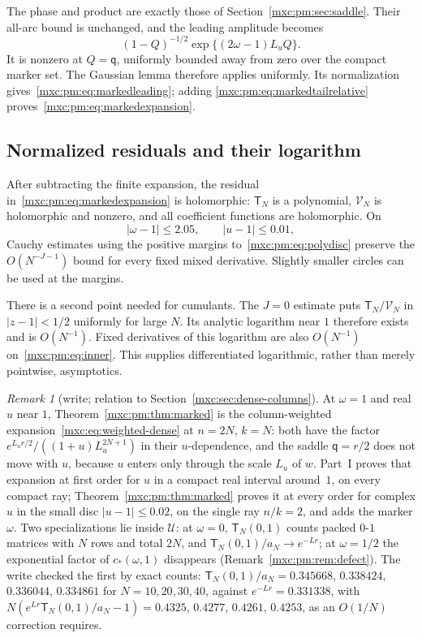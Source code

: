 \documentclass[11pt]{article}
\numberwithin{equation}{section}
\theoremstyle{definition}
\theoremstyle{remark}
\newtheorem{remark}[theorem]{Remark}
\begin{document}
The phase and product are exactly those of Section~\ref{mxc:pm:sec:saddle}.
Their all-arc bound is unchanged, and the leading amplitude becomes
\[
 (1-Q)^{-1/2}\exp\{(2\omega-1)L_uQ\}.
\]
It is nonzero at $Q=\mathsf q$, uniformly bounded away from zero over the
compact marker set. The Gaussian lemma therefore applies uniformly. Its
normalization gives~\eqref{mxc:pm:eq:markedleading}; adding
\eqref{mxc:pm:eq:markedtailrelative} proves~\eqref{mxc:pm:eq:markedexpansion}.

\subsection{Normalized residuals and their logarithm}\label{mxc:pm:sec:residual}
After subtracting the finite expansion, the residual
in~\eqref{mxc:pm:eq:markedexpansion} is holomorphic: $\mathsf T_N$ is a
polynomial, $\mathcal V_N$ is holomorphic and nonzero, and all coefficient
functions are holomorphic. On
\begin{equation}\label{mxc:pm:eq:inner}
 |\omega-1|\le2.05,\qquad |u-1|\le0.01,
\end{equation}
Cauchy estimates using the positive margins to~\eqref{mxc:pm:eq:polydisc}
preserve the $O(N^{-J-1})$ bound for every fixed mixed derivative. Slightly
smaller circles can be used at the margins.

There is a second point needed for cumulants. The $J=0$ estimate puts
$\mathsf T_N/\mathcal V_N$ in $|z-1|<1/2$ uniformly for large $N$. Its analytic
logarithm near $1$ therefore exists and is $O(N^{-1})$. Fixed derivatives of
this logarithm are also $O(N^{-1})$ on~\eqref{mxc:pm:eq:inner}. This supplies
differentiated logarithmic, rather than merely pointwise, asymptotics.

\begin{remark}[write; relation to Section~\ref{mxc:sec:dense-columns}]\label{mxc:pm:rem:weighted}
At $\omega=1$ and real $u$ near $1$, Theorem~\ref{mxc:pm:thm:marked} is the
column-weighted expansion~\eqref{mxc:eq:weighted-dense} at $n=2N$, $k=N$:
both have the factor $e^{L_ur/2}/((1+u)L_u^{2N+1})$ in their $u$-dependence,
and the saddle $\mathsf q=r/2$ does not move with $u$, because $u$ enters only
through the scale $L_u$ of $w$. Part~I proves that expansion at first order
for $u$ in a compact real interval around~$1$, on every compact ray;
Theorem~\ref{mxc:pm:thm:marked} proves it at every order for complex $u$ in the
small disc $|u-1|\le0.02$, on the single ray $n/k=2$, and adds the marker
$\omega$. Two specializations lie inside $\mathcal U$: at $\omega=0$,
$\mathsf T_N(0,1)$ counts packed $0$-$1$ matrices with $N$ rows and total $2N$,
and $\mathsf T_N(0,1)/a_N\to e^{-Lr}$; at $\omega=1/2$ the exponential factor of
$c_*(\omega,1)$ disappears (Remark~\ref{mxc:pm:rem:defect}). The write checked
the first by exact counts: $\mathsf T_N(0,1)/a_N=0.345668$, $0.338424$,
$0.336044$, $0.334861$ for $N=10,20,30,40$, against $e^{-Lr}=0.331338$, with
$N(e^{Lr}\mathsf T_N(0,1)/a_N-1)=0.4325$, $0.4277$, $0.4261$, $0.4253$, as an
$O(1/N)$ correction requires.
\end{remark}
\end{document}

